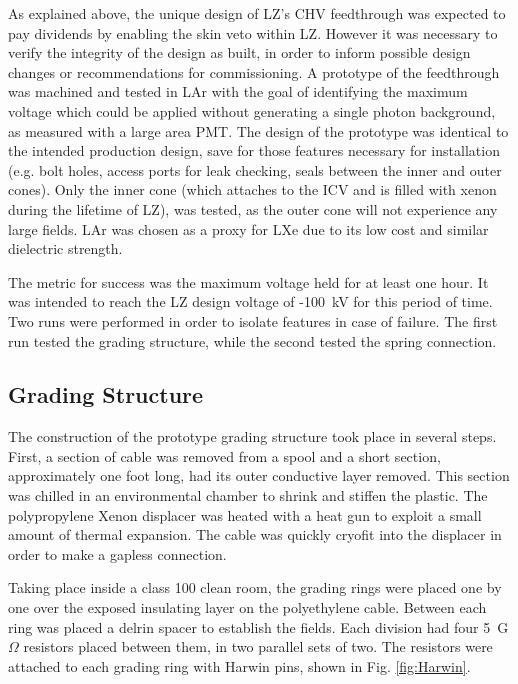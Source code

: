 As explained above, the unique design of LZ's CHV feedthrough was expected to pay dividends by enabling the skin veto within LZ.
However it was necessary to verify the integrity of the design as built, in order to inform possible design changes or recommendations for commissioning.
A prototype of the feedthrough was machined and tested in LAr with the goal of identifying the maximum voltage which could be applied without generating a single photon background, as measured with a large area PMT.
The design of the prototype was identical to the intended production design, save for those features necessary for installation (e.g. bolt holes, access ports for leak checking, seals between the inner and outer cones).
Only the inner cone (which attaches to the ICV and is filled with xenon during the lifetime of LZ), was tested, as the outer cone will not experience any large fields.
LAr was chosen as a proxy for LXe due to its low cost and similar dielectric strength\cite{tvrznikova_direct_2019, tvrznikova_sub-gev_2019}.

The metric for success was the maximum voltage held for at least one hour.
It was intended to reach the LZ design voltage of -100~kV for this period of time.
Two runs were performed in order to isolate features in case of failure.
The first run tested the grading structure, while the second tested the spring connection.



\subsection{Grading Structure}
The construction of the prototype grading structure took place in several steps.
First, a section of cable was removed from a spool and a short section, approximately one foot long, had its outer conductive layer removed.
This section was chilled in an environmental chamber to shrink and stiffen the plastic.
The polypropylene Xenon displacer was heated with a heat gun to exploit a small amount of thermal expansion.
The cable was quickly cryofit into the displacer in order to make a gapless connection.

Taking place inside a class 100 clean room, the grading rings were placed one by one over the exposed insulating layer on the polyethylene cable.
Between each ring was placed a delrin spacer to establish the fields.
Each division had four 5~G$\Omega$ resistors placed between them, in two parallel sets of two.
The resistors were attached to each grading ring with Harwin pins, shown in Fig. \ref{fig:Harwin}.

